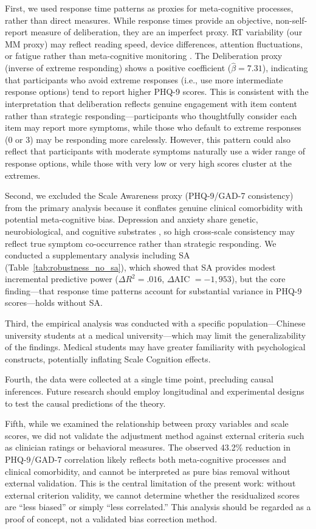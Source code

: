 \documentclass[10pt,twocolumn]{article}
\begin{document}
First, we used response time patterns as proxies for meta-cognitive processes, rather than direct measures. While response times provide an objective, non-self-report measure of deliberation, they are an imperfect proxy. RT variability (our MM proxy) may reflect reading speed, device differences, attention fluctuations, or fatigue rather than meta-cognitive monitoring \citep{Wise2006}. The Deliberation proxy (inverse of extreme responding) shows a positive coefficient ($\hat{\beta} = 7.31$), indicating that participants who avoid extreme responses (i.e., use more intermediate response options) tend to report higher PHQ-9 scores. This is consistent with the interpretation that deliberation reflects genuine engagement with item content rather than strategic responding---participants who thoughtfully consider each item may report more symptoms, while those who default to extreme responses (0 or 3) may be responding more carelessly. However, this pattern could also reflect that participants with moderate symptoms naturally use a wider range of response options, while those with very low or very high scores cluster at the extremes.

Second, we excluded the Scale Awareness proxy (PHQ-9/GAD-7 consistency) from the primary analysis because it conflates genuine clinical comorbidity with potential meta-cognitive bias. Depression and anxiety share genetic, neurobiological, and cognitive substrates \citep{Clark1991, Mineka1998}, so high cross-scale consistency may reflect true symptom co-occurrence rather than strategic responding. We conducted a supplementary analysis including SA (Table~\ref{tab:robustness_no_sa}), which showed that SA provides modest incremental predictive power ($\Delta R^2 = .016$, $\Delta$AIC $= -1{,}953$), but the core finding---that response time patterns account for substantial variance in PHQ-9 scores---holds without SA.

Third, the empirical analysis was conducted with a specific population---Chinese university students at a medical university---which may limit the generalizability of the findings. Medical students may have greater familiarity with psychological constructs, potentially inflating Scale Cognition effects.

Fourth, the data were collected at a single time point, precluding causal inferences. Future research should employ longitudinal and experimental designs to test the causal predictions of the theory.

Fifth, while we examined the relationship between proxy variables and scale scores, we did not validate the adjustment method against external criteria such as clinician ratings or behavioral measures. The observed 43.2\% reduction in PHQ-9/GAD-7 correlation likely reflects both meta-cognitive processes and clinical comorbidity, and cannot be interpreted as pure bias removal without external validation. This is the central limitation of the present work: without external criterion validity, we cannot determine whether the residualized scores are ``less biased'' or simply ``less correlated.'' This analysis should be regarded as a proof of concept, not a validated bias correction method.
\end{document}
